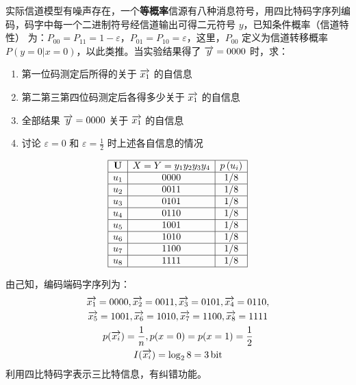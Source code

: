 \begin{remark}
    实际信道模型有噪声存在，一个\textbf{等概率}信源有八种消息符号，用四比特码字序列编码，码字中每一个二进制符号经信道输出可得二元符号 $y$，已知条件概率（信道特性） 为：$P_{00} = P_{11} = 1 - \varepsilon$，$P_{01} = P_{10} = \varepsilon$，这里，$P_{00}$ 定义为信道转移概率$P(y = 0 | x = 0)$，以此类推。当实验结果得了 $\overrightarrow{y} = 0000$ 时，求：

    \begin{minipage}{0.5\linewidth}
        \begin{enumerate}
            \item 第一位码测定后所得的关于 $\overrightarrow{x_1}$ 的自信息
            \item 第二第三第四位码测定后各得多少关于 $\overrightarrow{x_1}$ 的自信息
            \item 全部结果 $\overrightarrow{y} = 0000$ 关于 $\overrightarrow{x_1}$ 的自信息
            \item 讨论 $\varepsilon = 0$ 和 $\varepsilon = \frac{1}{2}$ 时上述各自信息的情况
        \end{enumerate}
    \end{minipage}
    \hfill
    \begin{minipage}{0.35\linewidth}
        \[\begin{array}{|c|c|c|}
            \hline \mathbf{U} & X=Y=y_{1} y_{2} y_{3} y_{4} & p\left(u_{i}\right) \\
            \hline u_{1} & 0000 & 1/8 \\
            \hline u_{2} & 0011 & 1/8 \\
            \hline u_{3} & 0101 & 1/8 \\
            \hline u_{4} & 0110 & 1/8 \\
            \hline u_{5} & 1001 & 1/8 \\
            \hline u_{6} & 1010 & 1/8 \\
            \hline u_{7} & 1100 & 1/8 \\
            \hline u_{8} & 1111 & 1/8 \\
            \hline
        \end{array}\]
    \end{minipage}
    
    \begin{solution}
        由己知，编码端码字序列为：
        \begin{gather*}
            \overrightarrow{x_{1}}=0000, \overrightarrow{x_{2}}=0011, \overrightarrow{x_{3}}=0101, \overrightarrow{x_{4}}=0110,\\
            \overrightarrow{x_{5}}=1001, \overrightarrow{x_{6}}=1010, \overrightarrow{x_{7}}=1100, \overrightarrow{x_{8}}=1111\\
            p(\overrightarrow{x_i}) = \frac{1}{n}, p(x = 0) = p(x = 1) = \frac{1}{2} \\I(\overrightarrow{x_i}) = \log_2 8 = \SI{3}{bit}
        \end{gather*}
        利用四比特码字表示三比特信息，有纠错功能。


\end{solution}
\end{remark}
